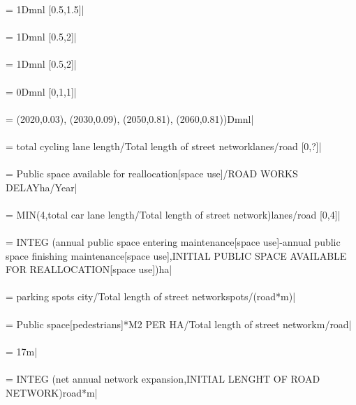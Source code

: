  = {\small 1Dmnl [0.5,1.5]|} \\ \\ 
 = {\small 1Dmnl [0.5,2]|} \\ \\ 
 = {\small 1Dmnl [0.5,2]|} \\ \\ 
 = {\small 0Dmnl [0,1,1]|} \\ \\ 
 = {\small (2020,0.03), (2030,0.09), (2050,0.81), (2060,0.81))Dmnl|} \\ \\ 
 = {\small total cycling lane length/Total length of street networklanes/road [0,?]|} \\ \\ 
 = {\small Public space available for reallocation[space use]/ROAD WORKS DELAYha/Year|} \\ \\ 
 = {\small MIN(4,total car lane length/Total length of street network)lanes/road [0,4]|} \\ \\ 
 = {\small  INTEG (annual public space entering maintenance[space use]-annual public space finishing maintenance[space use],INITIAL PUBLIC SPACE AVAILABLE FOR REALLOCATION[space use])ha|} \\ \\ 
 = {\small parking spots city/Total length of street networkspots/(road*m)|} \\ \\ 
 = {\small Public space[pedestrians]*M2 PER HA/Total length of street networkm/road|} \\ \\ 
 = {\small 17m|} \\ \\ 
 = {\small  INTEG (net annual network expansion,INITIAL LENGHT OF ROAD NETWORK)road*m|} \\ \\ 
